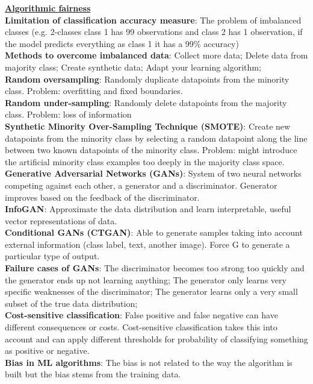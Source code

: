 \documentclass[a4paper,7pt,landscape]{extarticle}
\begin{document}
\begin{multicols}{3}
\begin{boxA}
\underline{\textbf{Algorithmic fairness}}\\
\textbf{Limitation of classification accuracy measure}: The problem of imbalanced classes (e.g. 2-classes class 1 has 99 observations and class 2 has 1 observation, if the model predicts everything as class 1 it has a 99\% accuracy)\\
\textbf{Methods to overcome imbalanced data}: Collect more data; Delete data from majority class; Create synthetic data; Adapt your learning algorithm;\\
\textbf{Random oversampling}: Randomly duplicate datapoints from the minority class. Problem: overfitting and fixed boundaries.\\
\textbf{Random under-sampling}: Randomly delete datapoints from the majority class. Problem: loss of information\\
\textbf{Synthetic Minority Over-Sampling Technique (SMOTE)}: Create new datapoints from the minority class by selecting a random datapoint along the line between two known datapoints of the minority class. Problem: might introduce the artificial minority class examples too deeply in the majority class space.\\
\textbf{Generative Adversarial Networks (GANs)}: System of two neural networks competing against each other, a generator and a discriminator. Generator improves based on the feedback of the discriminator.\\
\textbf{InfoGAN}: Approximate the data distribution and learn interpretable, useful vector representations of data.\\
\textbf{Conditional GANs (CTGAN)}: Able to generate samples taking into account external information (class label, text, another image). Force G to generate a particular type of output.\\
\textbf{Failure cases of GANs}: The discriminator becomes too strong too quickly and the generator ends up not learning anything; The generator only learns very specific weaknesses of the discriminator; The generator learns only a very small subset of the true data distribution;\\
\textbf{Cost-sensitive classification}: False positive and false negative can have different consequences or costs. Cost-sensitive classification takes this into account and can apply different thresholds for probability of classifying something as positive or negative.\\
\textbf{Bias in ML algorithms}: The bias is not related to the way the algorithm is built but the bias stems from the training data.\\

\end{boxA}
\end{multicols}
\end{document}

